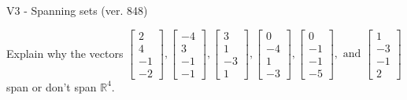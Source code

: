 \begin{exercise}
  \begin{exerciseTitle}V3 - Spanning sets (ver. 848)\end{exerciseTitle}
  \begin{exerciseStatement}
    Explain why the vectors \(\left[\begin{array}{r}
2 \\
4 \\
-1 \\
-2
\end{array}\right] , \left[\begin{array}{r}
-4 \\
3 \\
-1 \\
-1
\end{array}\right] , \left[\begin{array}{r}
3 \\
1 \\
-3 \\
1
\end{array}\right] , \left[\begin{array}{r}
0 \\
-4 \\
1 \\
-3
\end{array}\right] , \left[\begin{array}{r}
0 \\
-1 \\
-1 \\
-5
\end{array}\right] , \text{ and } \left[\begin{array}{r}
1 \\
-3 \\
-1 \\
2
\end{array}\right]\) span or don't span \(\mathbb{R}^4\). 
	



\end{exerciseStatement}
\end{exercise}
